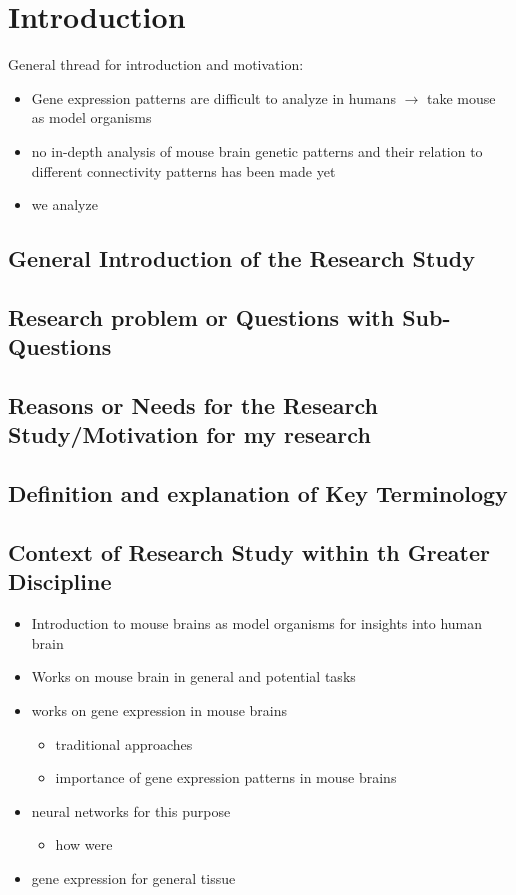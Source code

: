 \documentclass[]{article}
\begin{document}
\newpage

\section{Introduction}
General thread for introduction and motivation:
\begin{itemize}
	\item Gene expression patterns are difficult to analyze in humans $\rightarrow$ take mouse as model organisms
	\item no in-depth analysis of mouse brain genetic patterns and their relation to different connectivity patterns has been made yet
	\item we analyze 
\end{itemize}

\subsection*{General Introduction of the Research Study}

\subsection*{Research problem or Questions with Sub-Questions}

\subsection*{Reasons or Needs for the Research Study/Motivation for my research}

\subsection*{Definition and explanation of Key Terminology}

\subsection*{Context of Research Study within th Greater Discipline}

\begin{itemize}
	\item Introduction to mouse brains as model organisms for insights into human brain
	\item Works on mouse brain in general and potential tasks
	\item works on gene expression in mouse brains
	\begin{itemize}
		\item traditional approaches
		\item importance of gene expression patterns in mouse brains
	\end{itemize}
	\item neural networks for this purpose
	\begin{itemize}
		\item how were 
	\end{itemize}
	\item gene expression for general tissue
	
\end{itemize}
\end{document}
